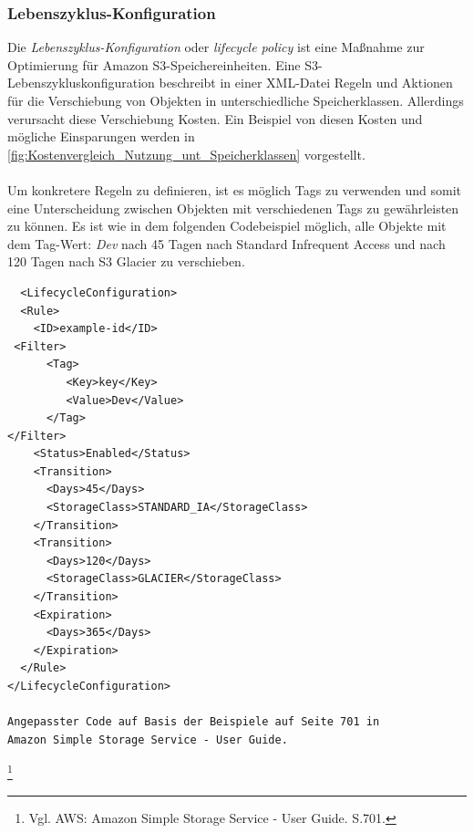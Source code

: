 \subsubsection{Lebenszyklus-Konfiguration}\label{ssec:Lebenszyklus-Konfiguration}
Die \textit{Lebenszyklus-Konfiguration} oder \textit{lifecycle policy} ist eine Maßnahme zur Optimierung für Amazon S3-Speichereinheiten. Eine S3-Lebenszykluskonfiguration beschreibt in einer XML-Datei Regeln und Aktionen für die Verschiebung von Objekten in unterschiedliche Speicherklassen. Allerdings verursacht diese Verschiebung Kosten. Ein Beispiel von diesen Kosten und mögliche Einsparungen werden in \autoref{fig:Kostenvergleich_Nutzung_unt_Speicherklassen} vorgestellt.
\\\\
Um konkretere Regeln zu definieren, ist es möglich Tags zu verwenden und somit eine Unterscheidung zwischen Objekten mit verschiedenen Tags zu gewährleisten zu können. Es ist wie in dem folgenden Codebeispiel möglich, alle Objekte mit dem Tag-Wert: \textit{Dev} nach 45 Tagen nach Standard Infrequent Access und nach 120 Tagen nach S3 Glacier zu verschieben.
\begin{lstlisting}
  <LifecycleConfiguration>
  <Rule>
    <ID>example-id</ID>
 <Filter>
      <Tag>
         <Key>key</Key>
         <Value>Dev</Value>
      </Tag>
</Filter>
    <Status>Enabled</Status>
    <Transition>
      <Days>45</Days>
      <StorageClass>STANDARD_IA</StorageClass>
    </Transition>
    <Transition>
      <Days>120</Days>
      <StorageClass>GLACIER</StorageClass>
    </Transition>
    <Expiration>
      <Days>365</Days>
    </Expiration>
  </Rule>
</LifecycleConfiguration>

Angepasster Code auf Basis der Beispiele auf Seite 701 in 
Amazon Simple Storage Service - User Guide. 
\end{lstlisting}
\footnote{Vgl. AWS: Amazon Simple Storage Service - User Guide. S.701.\cite{AMZ18}}\\

